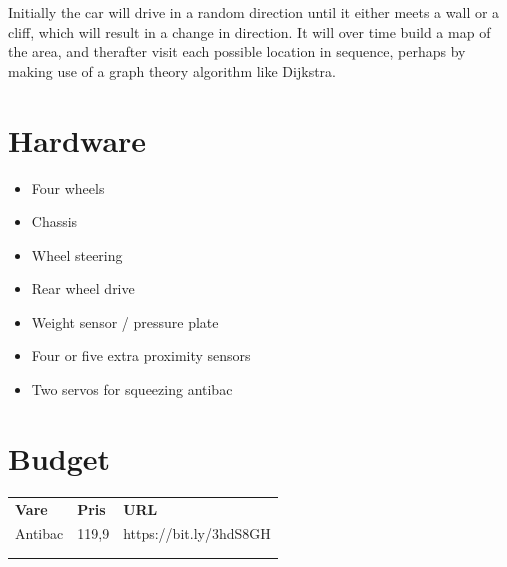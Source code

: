 \documentclass{article}
\begin{document}
	Initially the car will drive in a random direction until it either meets a wall or a cliff, which will result in a change in direction. It will over time build a map of the area, and therafter visit each possible location in sequence, perhaps by making use of a graph theory algorithm like Dijkstra.

\newpage
\section{Hardware}
	\begin{itemize}
		\item{Four wheels}
		\item{Chassis}
		\item{Wheel steering}
		\item{Rear wheel drive}
		\item{Weight sensor / pressure plate}
		\item{Four or five extra proximity sensors}
		\item{Two servos for squeezing antibac}
	\end{itemize}
\newpage
\section{Budget}
\begin{table}[]
\begin{tabular}{lll}
\textbf{Vare} & \textbf{Pris} & \textbf{URL}      \\
Antibac       & 119,9         & https://bit.ly/3hdS8GH \\
              &               &                   \\
              &               &                  
\end{tabular}
\end{table}
\end{document}
